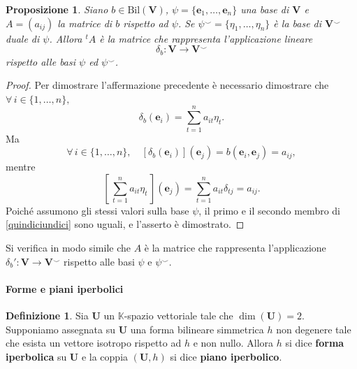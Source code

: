 \documentclass{article}
\theoremstyle{plain}
\newtheorem{prop}[thm]{Proposizione}
\theoremstyle{definition}
\newtheorem{defn}{Definizione}[section]
\theoremstyle{remark}
\begin{document}
\begin{bxthm}
\begin{prop}
Siano $b\in\mathrm{Bil}(\mathbf{V})$, $\psi = \{\mathbf{e}_1, \ldots, \mathbf{e}_n\}$ 
una base di $\mathbf{V}$ e $A = (a_{ij})$ la matrice di $b$ rispetto ad $\psi$. Se 
$\psi^\smallsmile = \{\eta_1, \ldots, \eta_n\}$ è la base di $\mathbf{V}^\smallsmile$ duale di $\psi$. 
Allora ${}^tA$ è la matrice che rappresenta l'applicazione lineare
\[\delta_b: \mathbf{V} \to \mathbf{V}^\smallsmile\]
rispetto alle basi $\psi$ ed $\psi^\smallsmile$.    
\end{prop}
\end{bxthm}
\begin{proof}
Per dimostrare l'affermazione precedente è necessario dimostrare che $\forall\,i \in \{1, \ldots, n\},$
\begin{equation}\label{quindiciundici}
    \delta_b(\mathbf{e}_i) = \sum_{t=1}^n a_{it}\eta_t.
\end{equation}
Ma 
\[\forall\,i \in \{1, \ldots, n\},\quad[\delta_b(\mathbf{e}_i)](\mathbf{e}_j) = b(\mathbf{e}_i, \mathbf{e}_j) = a_{ij},\]
mentre
\[\left[\,\sum_{t=1}^n a_{it}\eta_t\,\right](\mathbf{e}_j) = \sum_{t=1}^n a_{it}\delta_{tj} = a_{ij}.\]
Poiché assumono gli stessi valori sulla base $\psi$, il primo e il secondo membro di \ref{quindiciundici} sono uguali, e l'asserto è dimostrato.
\end{proof}

\vspace{10pt}

Si verifica in modo simile che $A$ è la matrice che rappresenta l'applicazione 
$\delta_b': \mathbf{V} \to \mathbf{V}^\smallsmile$ rispetto alle basi $\psi$ e $\psi^\smallsmile$.

\vspace{10pt}

\paragraph{Forme e piani iperbolici}
\begin{bxthm}
\begin{defn}
Sia $\mathbf{U}$ un $\mathbb{K}$-spazio vettoriale tale che $\dim(\mathbf{U}) = 2$. 
Supponiamo assegnata su $\mathbf{U}$ una forma bilineare simmetrica $h$ non degenere tale che esista 
un vettore isotropo rispetto ad $h$ e non nullo. Allora $h$ si dice \textbf{forma iperbolica} su 
$\mathbf{U}$ e la coppia $(\mathbf{U}, h)$ si dice \textbf{piano iperbolico}.    
\end{defn}
\end{bxthm}
\end{document}
